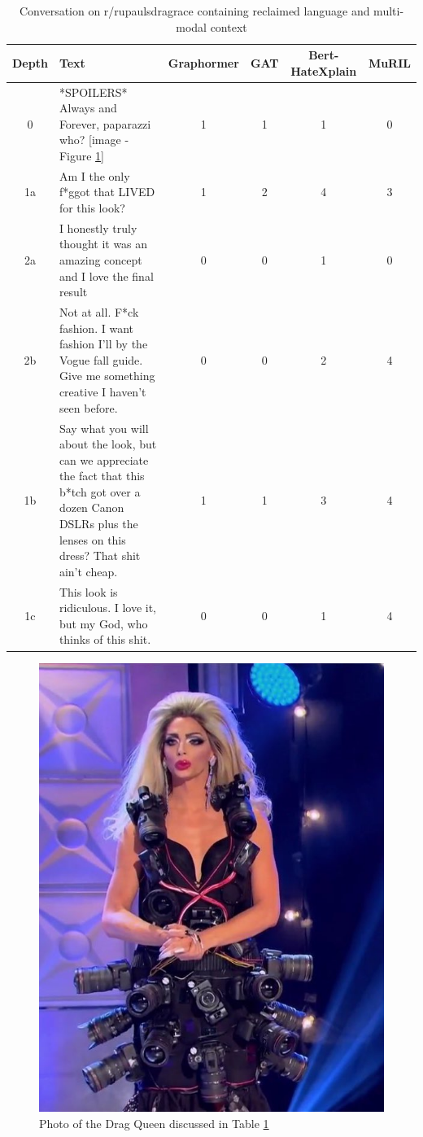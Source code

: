 \documentclass[letterpaper]{article} %
\begin{document}
\begin{table}
\centering
\caption{Conversation on r/rupaulsdragrace containing reclaimed language and multi-modal context}
\begin{tabular}{c|p{8cm}|c|c|c|c}
Depth & Text & Graphormer & GAT & Bert-HateXplain & MuRIL \\
\hline
\hline
0 & *SPOILERS* Always and Forever, paparazzi who? [image - Figure \ref{fig:drag}] & 1 & 1 & 1 & 0 \\
\hline
1a & Am I the only f*ggot that LIVED for this look? & 1 & 2 & 4 & 3  \\
\hline
2a & I honestly truly thought it was an amazing concept and I love the final result & 0 & 0 & 1 & 0 \\
\hline
2b & Not at all. F*ck fashion. I want fashion I'll by the Vogue fall guide. Give me something creative I haven't seen before. & 0 & 0 & 2 & 4\\
\hline
1b & Say what you will about the look, but can we appreciate the fact that this b*tch got over a dozen Canon DSLRs plus the lenses on this dress? That shit ain't cheap. & 1 & 1 & 3 & 4 \\
\hline
1c & This look is ridiculous. I love it, but my God, who thinks of this shit. & 0 & 0 & 1 & 4
\end{tabular}
\label{tab:contextual-drag}
\end{table}

\begin{figure}
\centering
\includegraphics[width=0.55\linewidth]{drag.jpg}
\caption{Photo of the Drag Queen discussed in Table \ref{tab:contextual-drag}}
\label{fig:drag}
\end{figure}
\end{document}
